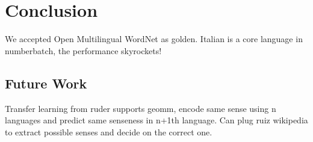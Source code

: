 
\chapter{Conclusion}%
\label{chap:conclusion}


We accepted Open Multilingual WordNet as golden.
Italian is a core language in numberbatch, the performance skyrockets!

\section{Future Work}%
\label{sec:future_work}

Transfer learning from ruder supports geomm, encode same sense using n languages and predict same senseness in n+1th language.
Can plug ruiz wikipedia to extract possible senses and decide on the correct one.

